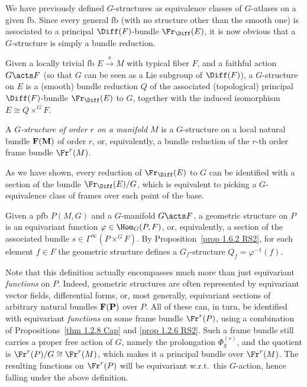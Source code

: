 We have previously defined $G$-structures as equivalence classes of $G$-atlases on a given \gls{fb}. Since every general \gls{fb} (with no structure other than the smooth one) is associated to a principal $\Diff(F)$-bundle $\Fr_{\Diff}(E)$, it is now obvious that a $G$-structure is simply a bundle reduction.

\begin{defn}[$G$-structure]
    Given a locally trivial \gls{fb} $E\overset{\pi}{\to}M$ with typical fiber $F$, and a faithful action $G\acts F$ (so that $G$ can be seen as a Lie subgroup of $\Diff(F)$), a $G$-structure on $E$ is a (smooth) bundle reduction $Q$ of the associated (topological) principal $\Diff(F)$-bundle $\Fr_{\Diff}(E)$ to $G$, together with the induced isomorphism $E\cong Q\times^G F$.

    A \emph{$G$-structure of order $r$ on a manifold $M$} is a $G$-structure on a local natural bundle $\bf{F}(M)$ of order $r$, or, equivalently, a bundle reduction of the $r$-th order frame bundle $\Fr^r(M)$.
\end{defn}

As we have shown, every reduction of $\Fr_{\Diff}(E)$ to $G$ can be identified with a section of the bundle $\Fr_{\Diff}(E)\slash G$, which is equivalent to picking a $G$-equivalence class of frames over each point of the base.

\begin{defn}\label{def geom structure}
    Given a \gls{pfb} $P(M,G)$ and a $G$-manifold $G\acts F$, a geometric structure on $P$ is an equivariant function $\varphi\in \Hom_G(P,F)$, or, equivalently, a section of the associated bundle $s\in \Gamma^\infty(P\times^G F)$. By Proposition~\ref{prop 1.6.2 RS2}, for each element $f\in F$ the geometric structure defines a $G_f$-structure $Q_f=\varphi^{-1}(f)$.
\end{defn}

\begin{rem}\label{rem geometric structures}
    Note that this definition actually encompasses much more than just equivariant \emph{functions} on $P$. Indeed, geometric structures are often represented by equivariant vector fields, differential forms, or, most generally, equivariant sections of arbitrary natural bundles $\bf{F}(P)$ over $P$. All of these can, in turn, be identified with equivariant \emph{functions} on some frame bundle $\Fr^r(P)$, using a combination of Propositions~\ref{thm 1.2.8 Cap} and \ref{prop 1.2.6 RS2}. Such a frame bundle still carries a proper free action of $G$, namely the prolongation $\Phi^{(r)}_g$, and the quotient is $\Fr^r(P)\slash G\cong \Fr^r(M)$, which makes it a principal bundle over $\Fr^r(M)$. The resulting functions on $\Fr^r(P)$ will be equivariant w.r.t.\ this $G$-action, hence falling under the above definition.
\end{rem}

